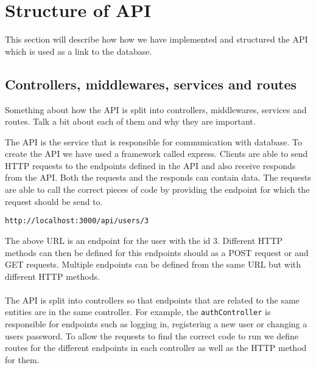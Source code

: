 \section{Structure of API}
This section will describe how how we have implemented and structured the API which is used as a link to the database.


\subsection{Controllers, middlewares, services and routes}
Something about how the API is split into controllers, middlewares, services and routes.
Talk a bit about each of them and why they are important.

The API is the service that is responsible for communication with database. 
To create the API we have used a framework called express.
Clients are able to send HTTP requests to the endpoints defined in the API and also receive responds from the API.
Both the requests and the responds can contain data. 
The requests are able to call the correct pieces of code by providing the endpoint for which the request should be send to.
\begin{center}
    \texttt{http://localhost:3000/api/users/3}
\end{center}
The above URL is an endpoint for the user with the id 3. 
Different HTTP methods can then be defined for this endpoints should as a POST request or and GET requests.
Multiple endpoints can be defined from the same URL but with different HTTP methods.
\\\\
The API is split into controllers so that endpoints that are related to the same entities are in the same controller. 
For example, the \texttt{authController} is responsible for endpoints such as logging in, registering a new user or changing a users password.
To allow the requests to find the correct code to run we define routes for the different endpoints in each controller as well as the HTTP method for them.

